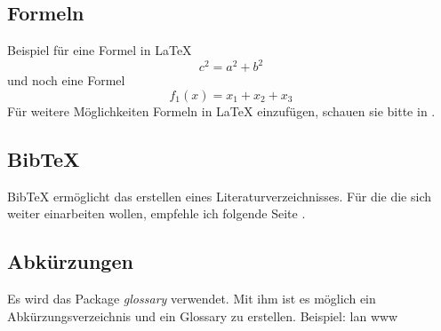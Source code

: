 \subsection{Formeln}
Beispiel für eine Formel in \LaTeX{}
\begin{equation}
	c^2 = a^2 + b^2
\end{equation}
und noch eine Formel
\begin{equation}
	f_1(x) = x_1 + x_2 + x_3
\end{equation}
Für weitere Möglichkeiten Formeln in \LaTeX{} einzufügen, schauen sie bitte in \cite{Peters2005}.

\subsection{{Bib\TeX}}
Bib\TeX{} ermöglicht das erstellen eines Literaturverzeichnisses. Für die die sich weiter einarbeiten wollen, empfehle ich folgende Seite \cite{wiki:bibtex}.

\subsection{Abkürzungen}
Es wird das Package \textit{glossary} verwendet. Mit ihm ist es möglich ein Abkürzungsverzeichnis und ein Glossary zu erstellen. Beispiel: \acrfull{lan} \acrfull{www}
